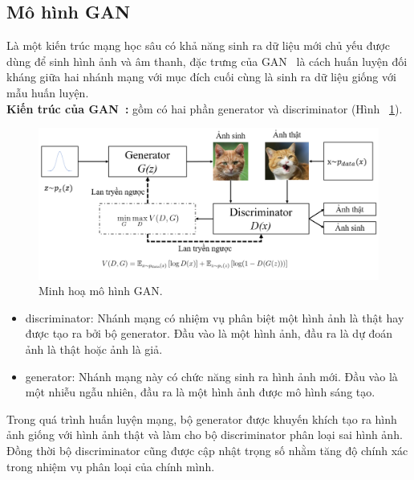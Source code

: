  \subsection{Mô hình GAN}
 Là một kiến trúc mạng học sâu có khả năng sinh ra dữ liệu mới chủ yếu được dùng để sinh hình ảnh và âm thanh, đặc trưng của GAN~\cite{Goodfellow2014GenerativeAN} là cách huấn luyện đối kháng giữa hai nhánh mạng với mục đích cuối cùng là sinh ra dữ liệu giống với mẫu huấn luyện.\\
 \textbf{Kiến trúc của GAN~\cite{Goodfellow2014GenerativeAN}:} gồm có hai phần \gls{generator} và \gls{discriminator} (Hình ~\ref{fig:model-gan-1}).
 \begin{figure}[h]
 	\centering
 	\includegraphics[width=0.9\linewidth]{Images/model-gan-1.png}
 	\caption{
 		Minh hoạ mô hình GAN.
 	}
 	\label{fig:model-gan-1}
 \end{figure}
 \begin{itemize}
 	 \item \Gls{discriminator}: Nhánh mạng có nhiệm vụ phân biệt một hình ảnh là thật hay được tạo ra bởi bộ \gls{generator}. Đầu vào là một hình ảnh, đầu ra là dự đoán ảnh là thật hoặc ảnh là giả.
 	 	
 	\item \Gls{generator}: Nhánh mạng này có chức năng sinh ra hình ảnh mới. Đầu vào là một nhiễu ngẫu nhiên, đầu ra là một hình ảnh được mô hình sáng tạo.	
 \end{itemize}
Trong quá trình huấn luyện mạng, bộ \gls{generator} được khuyến khích tạo ra hình ảnh giống với hình ảnh thật và làm cho bộ \gls{discriminator} phân loại sai hình ảnh. Đồng thời bộ \gls{discriminator} cũng được cập nhật trọng số nhằm tăng độ chính xác trong nhiệm vụ phân loại của chính mình.

